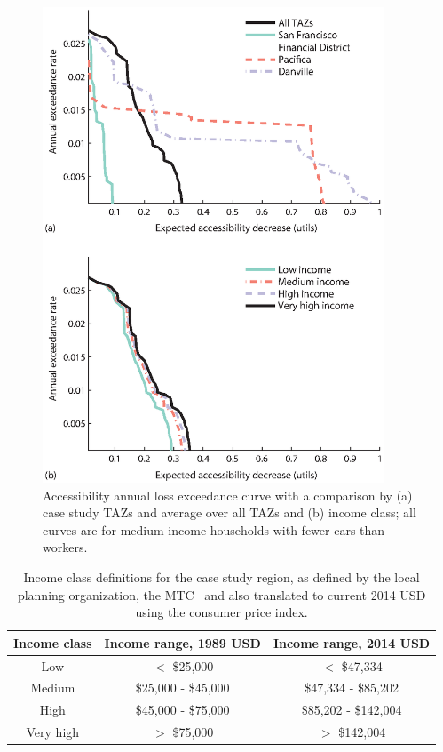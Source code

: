 \begin{figure}[!htb]
\centering
\includegraphics[width=4in]{FIGS/equity_acc_loss_curves.eps} 
\caption{Accessibility annual loss exceedance curve with a comparison by (a) case study TAZs and average over all TAZs and (b) income class; all curves are for medium income households with fewer cars than workers.}
\label{fig:acc_by_TAZ_and_income}
\end{figure}


\begin{table}
\caption{Income class definitions for the case study region, as defined by the local planning organization, the MTC~\cite{ory_personal_2013} and also translated to current 2014 USD using the consumer price index.}
\centering
\begin{tabular}{c|c|c}
\textbf{Income class}           & \textbf{Income range, 1989 USD} & \textbf{Income range, 2014 USD} \\
\hline
Low & $<$ \$25,000 & $<$ \$47,334\\
Medium &  \$25,000 - \$45,000 & \$47,334 - \$85,202\\
High & \$45,000 - \$75,000 & \$85,202 - \$142,004 \\
Very high & $>$ \$75,000 & $>$ \$142,004
\end{tabular}
\label{tab:incomes}
\end{table}


